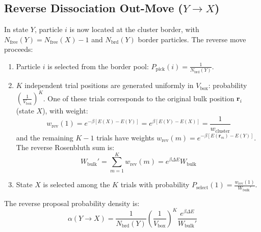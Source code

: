 \documentclass[11pt,a4paper]{article}
\begin{document}
\subsection{Reverse Dissociation Out-Move \texorpdfstring{($Y \to X$)}{Y -> X}}
In state $Y$, particle $i$ is now located at the cluster border, with $N_{\text{free}}(Y) = N_{\text{free}}(X) - 1$ and $N_{\text{brd}}(Y)$ border particles. The reverse move proceeds:
\begin{enumerate}
    \item Particle $i$ is selected from the border pool: $P_{\text{pick}}(i) = \frac{1}{N_{\text{brd}}(Y)}$.
    \item $K$ independent trial positions are generated uniformly in $V_{\text{box}}$: probability $\left(\frac{1}{V_{\text{box}}}\right)^K$. One of these trials corresponds to the original bulk position $\mathbf{r}_i$ (state $X$), with weight:
    \begin{equation}
    w_{\text{rev}}(1) = e^{-\beta [E(X) - E(Y)]} = e^{\beta [E(Y) - E(X)]} = \frac{1}{w_{\text{cluster}}}
    \end{equation}
    and the remaining $K-1$ trials have weights $w_{\text{rev}}(m) = e^{-\beta [E(\mathbf{r}_m) - E(Y)]}$. The reverse Rosenbluth sum is:
    \begin{equation}
    W_{\text{bulk}}' = \sum_{m=1}^K w_{\text{rev}}(m) = e^{\beta \Delta E} W_{\text{bulk}}
    \end{equation}
    \item State $X$ is selected among the $K$ trials with probability $P_{\text{select}}(1) = \frac{w_{\text{rev}}(1)}{W_{\text{bulk}}'}$.
\end{enumerate}

The reverse proposal probability density is:
\begin{equation}
\alpha(Y \to X) = \frac{1}{N_{\text{brd}}(Y)} \left(\frac{1}{V_{\text{box}}}\right)^K \frac{e^{\beta \Delta E}}{W_{\text{bulk}}'}
\end{equation}
\end{document}

